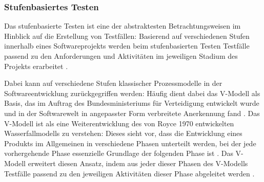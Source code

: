 \subsubsection{Stufenbasiertes Testen}\label{subsec:stufen}

Das stufenbasierte Testen ist eine der abstraktesten Betrachtungsweisen im Hinblick auf die Erstellung von Testfällen: Basierend auf verschiedenen Stufen innerhalb eines Softwareprojekts werden beim stufenbasierten Testen Testfälle passend zu den Anforderungen und Aktivitäten im jeweiligen Stadium des Projekts erarbeitet \cite[S. 5]{ammann2008introduction}. 

Dabei kann auf verschiedene Stufen klassischer Prozessmodelle in der Softwareentwicklung zurückgegriffen werden: Häufig dient dabei das V-Modell als Basis, das im Auftrag des Bundesministeriums für Verteidigung entwickelt wurde und in der Softwarewelt in angepasster Form verbreitete Anerkennung fand \cite[S. 190]{ludewig2010software}. Das V-Modell ist als eine Weiterentwicklung des von Royce \cite{royce1987managing} 1970 entwickelten Wasserfallmodells zu verstehen: Dieses sieht vor, dass die Entwicklung eines Produkts im Allgemeinen in verschiedene Phasen unterteilt werden, bei der jede vorhergehende Phase essenzielle Grundlage der folgenden Phase ist \cite[S. 57 f.]{sommerville2012software-engineering}. Das V-Modell erweitert diesen Ansatz, indem aus jeder dieser Phasen des V-Modells Testfälle passend zu den jeweiligen Aktivitäten dieser Phase abgeleitet werden \cite[S. 190]{ludewig2010software}. %

